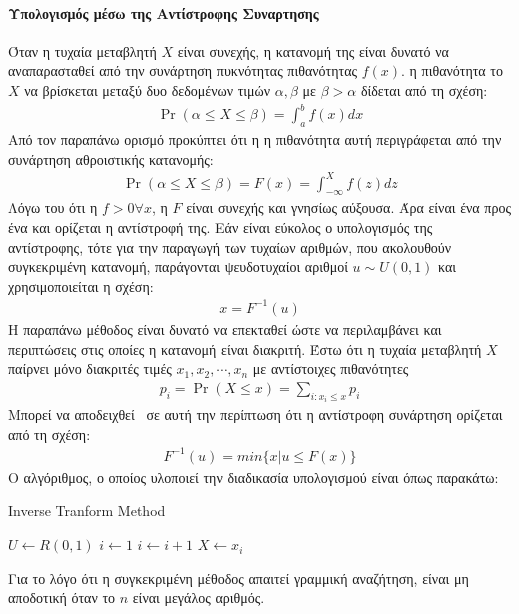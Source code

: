 \documentclass[12pt]{report}
\begin{document}
\paragraph{Υπολογισμός μέσω της Αντίστροφης Συναρτησης}
Όταν η τυχαία μεταβλητή \(X\) είναι συνεχής, η κατανομή της είναι δυνατό να αναπαρασταθεί από την συνάρτηση πυκνότητας πιθανότητας \(f(x)\). η πιθανότητα το \(X\) να βρίσκεται μεταξύ δυο δεδομένων τιμών \(\alpha, \beta\) με \(\beta>\alpha\) δίδεται από τη σχέση:
\begin{align*}
\Pr(\alpha \leq X \leq \beta)=\int_{a}^{b} f(x)dx
\end{align*}
Από τον παραπάνω ορισμό προκύπτει ότι η η πιθανότητα αυτή περιγράφεται από την συνάρτηση αθροιστικής κατανομής:
\begin{align*}
\Pr(\alpha \leq X \leq \beta)=F(x)=\int_{-\infty}^{X} f(z)dz
\end{align*}
Λόγω του ότι η \(f>0 \forall x\), η \(F\) είναι συνεχής και γνησίως αύξουσα. Άρα είναι ένα προς ένα και ορίζεται η αντίστροφή της. Εάν είναι εύκολος ο υπολογισμός της αντίστροφης, τότε για την παραγωγή των τυχαίων αριθμών, που ακολουθούν συγκεκριμένη κατανομή, παράγονται ψευδοτυχαίοι αριθμοί \(u \sim U(0, 1)\) και χρησιμοποιείται η σχέση:
\begin{align*}
x=F^{-1}(u)
\end{align*}
Η παραπάνω μέθοδος είναι δυνατό να επεκταθεί ώστε να περιλαμβάνει και περιπτώσεις στις οποίες η κατανομή είναι διακριτή. Έστω ότι η τυχαία μεταβλητή \(X\) παίρνει μόνο διακριτές τιμές \(x_1,x_2,\cdots,x_n\) με αντίστοιχες πιθανότητες
\begin{align*}
p_i=\Pr(X \leq x)=\sum_{i:x_i \leq x}^{} p_i
\end{align*}
Μπορεί να αποδειχθεί~\cite{book:04} σε αυτή την περίπτωση ότι η αντίστροφη συνάρτηση ορίζεται από τη σχέση:
\begin{align*}
F^{-1}(u)=min\{x|u \leq F(x)\}
\end{align*}
Ο αλγόριθμος, ο οποίος υλοποιεί την διαδικασία υπολογισμού είναι όπως παρακάτω:
\begin{algorithm}[H]
\caption{\textlatin{Inverse Tranform Method}}
\begin{algorithmic}[1]
  \State $U \leftarrow R(0,1)$
  \State $i \leftarrow 1$
    \State $i \leftarrow i+1$
  \EndWhile
  \State $X \leftarrow x_i$
\end{algorithmic}
\end{algorithm}
Για το λόγο ότι η συγκεκριμένη μέθοδος απαιτεί γραμμική αναζήτηση, είναι μη αποδοτική όταν το \(n\) είναι μεγάλος αριθμός.
\end{document}
